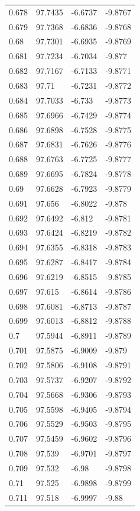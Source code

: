 \begin{tabular}{llll}
0.678 & 97.7435 & -6.6737 & -9.8767 \\
0.679 & 97.7368 & -6.6836 & -9.8768 \\
0.68 & 97.7301 & -6.6935 & -9.8769 \\
0.681 & 97.7234 & -6.7034 & -9.877 \\
0.682 & 97.7167 & -6.7133 & -9.8771 \\
0.683 & 97.71 & -6.7231 & -9.8772 \\
0.684 & 97.7033 & -6.733 & -9.8773 \\
0.685 & 97.6966 & -6.7429 & -9.8774 \\
0.686 & 97.6898 & -6.7528 & -9.8775 \\
0.687 & 97.6831 & -6.7626 & -9.8776 \\
0.688 & 97.6763 & -6.7725 & -9.8777 \\
0.689 & 97.6695 & -6.7824 & -9.8778 \\
0.69 & 97.6628 & -6.7923 & -9.8779 \\
0.691 & 97.656 & -6.8022 & -9.878 \\
0.692 & 97.6492 & -6.812 & -9.8781 \\
0.693 & 97.6424 & -6.8219 & -9.8782 \\
0.694 & 97.6355 & -6.8318 & -9.8783 \\
0.695 & 97.6287 & -6.8417 & -9.8784 \\
0.696 & 97.6219 & -6.8515 & -9.8785 \\
0.697 & 97.615 & -6.8614 & -9.8786 \\
0.698 & 97.6081 & -6.8713 & -9.8787 \\
0.699 & 97.6013 & -6.8812 & -9.8788 \\
0.7 & 97.5944 & -6.8911 & -9.8789 \\
0.701 & 97.5875 & -6.9009 & -9.879 \\
0.702 & 97.5806 & -6.9108 & -9.8791 \\
0.703 & 97.5737 & -6.9207 & -9.8792 \\
0.704 & 97.5668 & -6.9306 & -9.8793 \\
0.705 & 97.5598 & -6.9405 & -9.8794 \\
0.706 & 97.5529 & -6.9503 & -9.8795 \\
0.707 & 97.5459 & -6.9602 & -9.8796 \\
0.708 & 97.539 & -6.9701 & -9.8797 \\
0.709 & 97.532 & -6.98 & -9.8798 \\
0.71 & 97.525 & -6.9898 & -9.8799 \\
0.711 & 97.518 & -6.9997 & -9.88 \\

\end{tabular}
